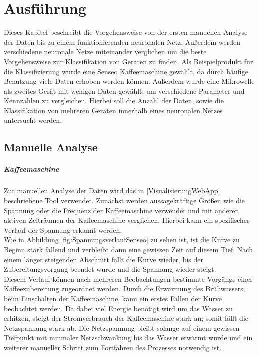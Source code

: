 \chapter{Ausführung}

    Dieses Kapitel beschreibt die Vorgehensweise von der ersten manuellen Analyse der Daten bis zu einem funktionierenden neuronalen Netz.
    Außerdem werden verschiedene neuronale Netze miteinander verglichen um die beste Vorgehensweise zur Klassifikation von Geräten zu finden.
    Als Beispielprodukt für die Klassifizierung wurde eine Senseo Kaffeemaschine gewählt, da durch häufige Benutzung viele Daten erhoben werden können. 
    Außerdem wurde eine Mikrowelle als zweites Gerät mit wenigen Daten gewählt, um verschiedene Parameter und Kennzahlen zu vergleichen.
    Hierbei soll die Anzahl der Daten, sowie die Klassifikation von mehreren Geräten innerhalb eines neuronalen Netzes untersucht werden.

\section{Manuelle Analyse} \label{ManuelleAnalyse}

    \paragraph{Kaffeemaschine}

    Zur manuellen Analyse der Daten wird das in \ref{VisualisierungWebApp} beschriebene Tool verwendet.
    Zunächst werden aussagekräftige Größen wie die Spannung oder die Frequenz der Kaffeemaschine verwendet und mit anderen aktiven Zeiträumen der Kaffeemaschine verglichen.
    Hierbei kann ein spezifischer Verlauf der Spannung erkannt werden.\\ 
    Wie in Abbildung \ref{fig:SpannungsverlaufSenseo} zu sehen ist, ist die Kurve zu Beginn stark fallend und verbleibt dann eine gewissen Zeit auf diesem Tief. 
    Nach einem länger steigenden Abschnitt fällt die Kurve wieder, bis der Zubereitungsvorgang beendet wurde und die Spannung wieder steigt.\\
    

    Diesem Verlauf können nach mehreren Beobachtungen bestimmte Vorgänge einer Kaffeezubereitung zugeordnet werden.
    Durch die Erwärmung des Brühwassers, beim Einschalten der Kaffeemaschine, kann ein erstes Fallen der Kurve beobachtet werden.
    Da dabei viel Energie benötigt wird um das Wasser zu erhitzen, steigt der Stromverbrauch der Kaffeemaschine stark an; somit fällt die Netzspannung stark ab.
    Die Netzspannung bleibt solange auf einem gewissen Tiefpunkt mit minmaler Netzschwankung bis das Wasser erwärmt wurde und ein weiterer manueller Schritt zum Fortfahren des Prozesses notwendig ist.\\
    

